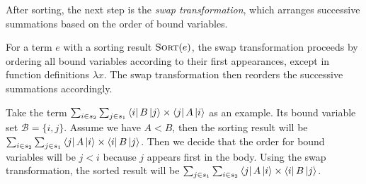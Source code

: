 After sorting, the next step is the \textit{swap transformation}, which arranges successive summations based on the order of bound variables.
\begin{definition}
For a term \( e \) with a sorting result \( \textsc{Sort}(e) \), the swap transformation proceeds by ordering all bound variables according to their first appearances, except in function definitions \( \lambda x \). The swap transformation then reorders the successive summations accordingly.
\end{definition}

Take the term $\sum_{i \in s_2} \sum_{j \in s_1} \bra{i} B \ket{j} \times \bra{j} A \ket{i}$ as an example. Its bound variable set $\mathcal{B} = \{i, j\}$. Assume we have $A < B$, then the sorting result will be $\sum_{i \in s_2} \sum_{j \in s_1} \bra{j} A \ket{i} \times \bra{i} B \ket{j}$. Then we decide that the order for bound variables will be $j < i$ because $j$ appears first in the body. Using the swap transformation, the sorted result will be $\sum_{j \in s_1} \sum_{i \in s_2} \bra{j} A \ket{i} \times \bra{i} B \ket{j}$.











